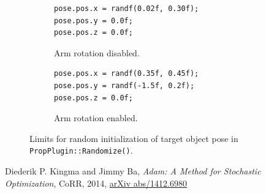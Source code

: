 \documentclass[11pt, onecolumn, oneside, reqno]{amsart}
\begin{document}
\begin{figure}[thpb]
\centering
\begin{subfigure}{.48\textwidth}
\begin{lstlisting}
pose.pos.x = randf(0.02f, 0.30f);
pose.pos.y = 0.0f;
pose.pos.z = 0.0f;
\end{lstlisting}
\caption{Arm rotation disabled.}
\end{subfigure}\hfill%
\begin{subfigure}{.48\textwidth}
\begin{lstlisting}
pose.pos.x = randf(0.35f, 0.45f);
pose.pos.y = randf(-1.5f, 0.2f);
pose.pos.z = 0.0f;
\end{lstlisting}
\caption{Arm rotation enabled.}
\end{subfigure}
\caption{Limits for random initialization of target object pose in \texttt{PropPlugin::Randomize()}.}
\label{fig:random_poses_for_arm_rotation}
\end{figure}

\begin{thebibliography}{1}
Diederik P. Kingma and Jimmy Ba, \textit{Adam: {A} Method for Stochastic Optimization}, CoRR, 2014, \href{http://arxiv.org/abs/1412.6980}{arXiv  abs/1412.6980}
\end{thebibliography}
\end{document}
